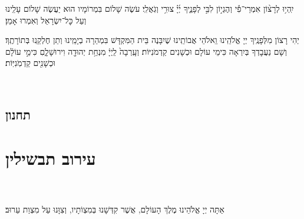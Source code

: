 \documentclass[twoside, openany, parskip=half, 11pt]{book}
\begin{document}
יִֽהְי֥וּ לְרָצ֨וֹן אִמְרֵי־פִ֡י וְהֶגְי֣וֹן לִבִּ֣י לְפָנֶ֑יךָ יְ֜יָ֗ צוּרִ֥י וְגֹֽאֲלִֽי׃ עֹשֶׂה שָׁלוֹם בִּמְרוֹמָיו הוּא יַעֲשֶׂה שָׁלוֹם עָלֵֽינוּ וְעַל כׇּל־יִשְׂרָאֵל וְאִמְרוּ אָמֵן׃


\begin{small}

יְהִי רָצוֹן מִלְּפָנֶֽיךָ יְיָ אֱלֹהֵֽינוּ וִֵאלֹהֵי אֲבוֹתֵֽינוּ שֶׁיִבָּנֶה בֵּית הַמִּקְדָּשׁ בִּמְהֵרָה בְיָמֵֽינוּ וְתֵן חֶלְקֵֽנוּ בְּתוֹרָתֶֽךָ׃ וְשָׁם נַעֲבׇדְךָ בְּיִרְאָה כִּימֵי עוֹלָם וּכְשָׁנִים קַדְמֹנִיּוֹת׃
וְעָֽרְבָה֙ לַֽיְיָ֔ מִנְחַ֥ת יְהוּדָ֖ה וִירוּשָׁלָ֑םִ כִּימֵ֣י עוֹלָ֔ם וּכְשָׁנִ֖ים קַדְמֹֽנִיּֽוֹת׃


\end{small}



\\



\section[תחנון]{ תחנון }


\nefilasapayim

\shomeryisroel

\fullkaddish

\label{mincha aleinu}

\aleinu
\mournerskaddish

\vfill

\quad{}\quad{}

\chapter[עירוב תבשילין]{ עירוב תבשילין }

\\
\\
אַתָּה יְיָ אֱלֹהֵינוּ מֶלֶךְ הָעוֹלָם, אֲשֶׁר קִדְּשָׁנוּ בְּמִצְוֹתָיו, וְצִוָּנוּ עַל מִצְוַת עֵרוּב׃
\end{document}

